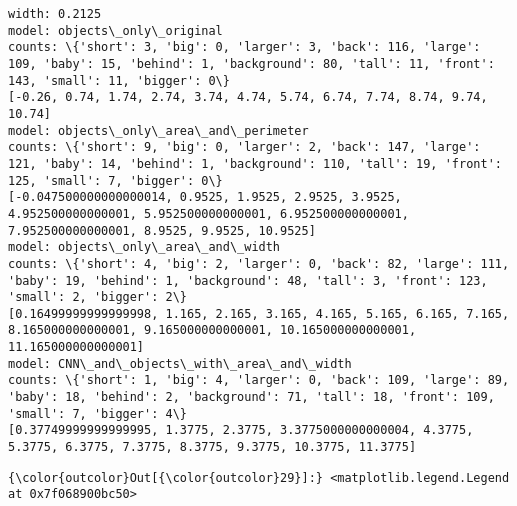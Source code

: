 \documentclass[11pt]{article}
\begin{document}
    \begin{Verbatim}[commandchars=\\\{\}]
width: 0.2125
model: objects\_only\_original
counts: \{'short': 3, 'big': 0, 'larger': 3, 'back': 116, 'large': 109, 'baby': 15, 'behind': 1, 'background': 80, 'tall': 11, 'front': 143, 'small': 11, 'bigger': 0\}
[-0.26, 0.74, 1.74, 2.74, 3.74, 4.74, 5.74, 6.74, 7.74, 8.74, 9.74, 10.74]
model: objects\_only\_area\_and\_perimeter
counts: \{'short': 9, 'big': 0, 'larger': 2, 'back': 147, 'large': 121, 'baby': 14, 'behind': 1, 'background': 110, 'tall': 19, 'front': 125, 'small': 7, 'bigger': 0\}
[-0.047500000000000014, 0.9525, 1.9525, 2.9525, 3.9525, 4.952500000000001, 5.952500000000001, 6.952500000000001, 7.952500000000001, 8.9525, 9.9525, 10.9525]
model: objects\_only\_area\_and\_width
counts: \{'short': 4, 'big': 2, 'larger': 0, 'back': 82, 'large': 111, 'baby': 19, 'behind': 1, 'background': 48, 'tall': 3, 'front': 123, 'small': 2, 'bigger': 2\}
[0.16499999999999998, 1.165, 2.165, 3.165, 4.165, 5.165, 6.165, 7.165, 8.165000000000001, 9.165000000000001, 10.165000000000001, 11.165000000000001]
model: CNN\_and\_objects\_with\_area\_and\_width
counts: \{'short': 1, 'big': 4, 'larger': 0, 'back': 109, 'large': 89, 'baby': 18, 'behind': 2, 'background': 71, 'tall': 18, 'front': 109, 'small': 7, 'bigger': 4\}
[0.37749999999999995, 1.3775, 2.3775, 3.3775000000000004, 4.3775, 5.3775, 6.3775, 7.3775, 8.3775, 9.3775, 10.3775, 11.3775]

    \end{Verbatim}

\begin{Verbatim}[commandchars=\\\{\}]
{\color{outcolor}Out[{\color{outcolor}29}]:} <matplotlib.legend.Legend at 0x7f068900bc50>
\end{Verbatim}
            
    \begin{center}
    \end{center}
    { \hspace*{\fill} \\}
    
\end{document}
